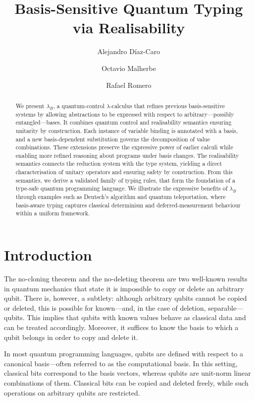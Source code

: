 \documentclass[a4paper,UKenglish,numberwithinsect,pdfa,anonymous]{lipics-v2021}
\title{Basis-Sensitive Quantum Typing via Realisability}
\author{Alejandro Díaz-Caro}
{
  Université de Lorraine, CNRS, Inria, LORIA, France
  \and
  Universidad de la República, CENUR Suroeste, Facultad de Ingeniería, InCo, Uruguay
}
{alejandro.diaz-caro@inria.fr}
{https://orcid.org/0000-0002-5175-6882}
{}
\author{Octavio Malherbe}
{Universidad de la República, Facultad de Ingeniería, IMERL, Uruguay}
{malherbe@fing.edu.uy}
{https://orcid.org/0009-0004-0624-9285}
{}
\author{Rafael Romero}
{Universidad Nacional de Quilmes, Departamento de Ciencia y Tecnología, Argentina
  \and 
ICC, CONICET-Universidad de Buenos Aires, Argentina}
{lromero@dc.uba.ar}
{https://orcid.org/0000-0003-3186-1172}	
{}
\theoremstyle{restatestyle}
\newcommand{\lambdaB}{\lambda_B}
\begin{document}
\setlength{\abovedisplayskip}{3pt}
\setlength{\belowdisplayskip}{3pt}
\setlength{\abovedisplayshortskip}{3pt}
\setlength{\belowdisplayshortskip}{3pt}

\maketitle
\begin{abstract}
  We present $\lambdaB$, a quantum‐control $\lambda$‐calculus that refines
  previous basis-sensitive systems by allowing abstractions to be expressed with
  respect to arbitrary---possibly entangled---bases. It combines quantum control 
  and realisability semantics ensuring unitarity by construction.
  Each instance of variable binding is annotated with a basis,
  and a new basis-dependent substitution governs the decomposition of value
  combinations. These extensions preserve the expressive power of earlier calculi
  while enabling more refined reasoning about programs under basis changes.
  The realisability semantics connects the reduction system with the type system,
  yielding a direct characterisation of unitary operators and ensuring safety by
  construction. From this semantics, we derive a validated family of typing rules, 
  that form the foundation of a type-safe quantum programming language. We
  illustrate the expressive benefits of $\lambdaB$ through examples such as 
  Deutsch’s algorithm and quantum teleportation, where basis-aware typing captures 
  classical determinism and deferred-measurement behaviour within a uniform 
  framework.
\end{abstract}
\newpage
\section{Introduction}
The no-cloning theorem \cite{WoottersZurek1982} and the no-deleting theorem
\cite{PatiBraunstein2000} are two well-known results in quantum mechanics that
state it is impossible to copy or delete an arbitrary qubit. 
There is, however, a subtlety: although arbitrary qubits
cannot be copied or deleted, this is possible for known---and, in the case of
deletion, separable---qubits. This implies that qubits with known values behave
as classical data and can be treated accordingly. Moreover, it suffices to know
the basis to which a qubit belongs in order to copy and delete it.

In most quantum programming languages, qubits are defined with respect to a
canonical basis—often referred to as the computational basis. In this setting,
classical bits correspond to the basis vectors, whereas qubits are unit-norm
linear combinations of them. Classical bits can be copied and deleted freely,
while such operations on arbitrary qubits are restricted.
\end{document}
